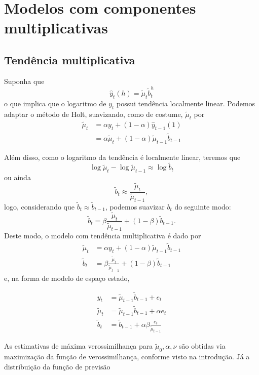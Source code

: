 \documentclass[
  letterpaper,
  DIV=11,
  numbers=noendperiod]{scrartcl}
\theoremstyle{plain}
\theoremstyle{plain}
\theoremstyle{definition}
\theoremstyle{definition}
\theoremstyle{remark}
\begin{document}
\hypertarget{modelos-com-componentes-multiplicativas}{%
\section{Modelos com componentes
multiplicativas}\label{modelos-com-componentes-multiplicativas}}

\hypertarget{tenduxeancia-multiplicativa}{%
\subsection{Tendência
multiplicativa}\label{tenduxeancia-multiplicativa}}

Suponha que \[\hat{y}_t(h)=\tilde{\mu}_t\tilde{b}_t^h\] o que implica
que o logaritmo de \(y_t\) possui tendência localmente linear. Podemos
adaptar o método de Holt, suavizando, como de costume, \(\tilde{\mu}_t\)
por
\[\begin{align}\tilde{\mu}_t&=\alpha y_t+(1-\alpha)\hat{y}_{t-1}(1)\\
&=\alpha\tilde{\mu}_{t}+(1-\alpha)\tilde{\mu}_{t-1}\tilde{b}_{t-1}\end{align}\]

Além disso, como o logaritmo da tendência é localmente linear, teremos
que \[\log \tilde{\mu}_t-\log\tilde{\mu}_{t-1}\approx \log\tilde{b}_t\]
ou ainda \[\tilde{b}_t\approx \frac{\tilde{\mu}_t}{\tilde{\mu}_{t-1}},\]
logo, considerando que \(\tilde{b}_t\approx \tilde{b}_{t-1}\), podemos
suavizar \(b_t\) do seguinte modo:
\[\tilde{b}_t=\beta\frac{\tilde{\mu}_t}{\tilde{\mu}_{t-1}}+(1-\beta)\tilde{b}_{t-1}.\]
Deste modo, o modelo com tendência multiplicativa é dado por
\[\begin{align}
\tilde{\mu}_t&=\alpha y_t+(1-\alpha)\tilde{\mu}_{t-1}\tilde{b}_{t-1}\\
\tilde{b}_t&=\beta\frac{\tilde{\mu}_t}{\tilde{\mu}_{t-1}}+(1-\beta)\tilde{b}_{t-1}
\end{align}\] e, na forma de modelo de espaço estado,

\[\begin{align}
y_t&=\tilde{\mu}_{t-1}\tilde{b}_{t-1}+e_t\\
\tilde{\mu}_t&=\tilde{\mu}_{t-1}\tilde{b}_{t-1}+\alpha e_t\\
\tilde{b}_t&=\tilde{b}_{t-1}+\alpha\beta\frac{e_t}{\tilde{\mu}_{t-1}}
\end{align}\]

As estimativas de máxima verossimilhança para
\(\tilde{\mu}_0,\alpha,\nu\) são obtidas via maximização da função de
verossimilhança, conforme visto na introdução. Já a distribuição da
função de previsão
\end{document}

